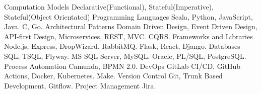   \begin{cvskills}
    \cvskill
      {Computation Models} %
      { Declarative(Functional), Stateful(Imperative), Stateful(Object Orientated)} %
    \cvskill
      {Programming Languages} %
      {  Scala, Python, JavaScript, Java.}
    \cvskill
      {} %
      {  C, Go.}
    \cvskill
      {Architectural Patterns} %
      {  Domain Driven Design, Event Driven Design, API-first Design, Microservices, REST, MVC.}
    \cvskill
      {} %
      {  CQRS.}
    \cvskill
      {Frameworks and Libraries} %
      {  Node.js, Express, DropWizard, RabbitMQ.}
    \cvskill
      {}
      {  Flask, React, Django.}
    \cvskill
    {Databases} %
    {  SQL, TSQL, Flyway.}
    \cvskill
    {} %
    {  MS SQL Server, MySQL.}
    \cvskill
    {} %
    {  Oracle, PL/SQL, PostgreSQL.}
    \cvskill
      {Process Automation}
      { Camunda, BPMN 2.0.}
    \cvskill
    {DevOps} %
      { GitLab CI/CD, GitHub Actions, Docker, Kubernetes.} %
    \cvskill
      {} %
      {  Make.}
    \cvskill
    {Version Control} %
    { Git, Trunk Based Development, Gitflow.} %
    \cvskill
    {Project Management} %
    { Jira.} %
  \end{cvskills}